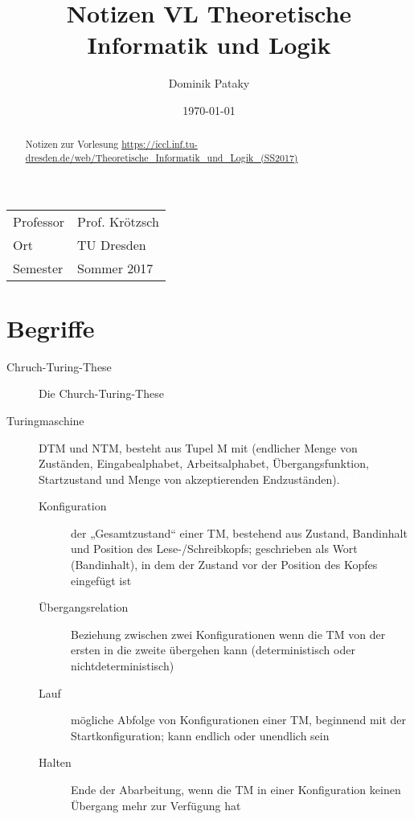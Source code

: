 \documentclass[a4paper,10pt]{article}
\title{Notizen VL Theoretische Informatik und Logik}
\author{Dominik Pataky}
\date{\today}
\newcommand{\vl}[1]{\colorbox{light-gray}{\textcolor{white}{\textbf{VL #1}}}}
\begin{document}
    \pagestyle{fancy}

    \rhead{\slshape\nouppercase{\leftmark}}
    \cfoot{\thepage}

    \maketitle


    \begin{abstract}
        Notizen zur Vorlesung \url{https://iccl.inf.tu-dresden.de/web/Theoretische_Informatik_und_Logik_(SS2017)}
    \end{abstract}


    \tableofcontents

    \vfill
    \begin{tabular}{p{3cm} p{10cm}}
        Professor & Prof. Krötzsch \\
        Ort & TU Dresden \\
        Semester & Sommer 2017 \\
    \end{tabular}


    \newpage
    \section{Begriffe}

    \begin{description}
        \item[Chruch-Turing-These] Die Church-Turing-These
        \item[Turingmaschine] DTM und NTM, besteht aus Tupel M mit (endlicher Menge von Zuständen, Eingabealphabet, Arbeitsalphabet, Übergangsfunktion, Startzustand und Menge von akzeptierenden Endzuständen). \vl{1}
        \begin{description}
            \item[Konfiguration]
                der „Gesamtzustand“ einer TM, bestehend aus Zustand, Bandinhalt und Position des Lese-/Schreibkopfs;
                geschrieben als Wort (Bandinhalt), in dem der Zustand vor der Position des Kopfes eingefügt ist
            \item[Übergangsrelation]
                Beziehung zwischen zwei Konfigurationen wenn die TM von der ersten in die zweite übergehen kann
                (deterministisch oder nichtdeterministisch)
            \item[Lauf]
                mögliche Abfolge von Konfigurationen einer TM, beginnend mit der Startkonfiguration; kann endlich oder unendlich sein
            \item[Halten]
                Ende der Abarbeitung, wenn die TM in einer Konfiguration keinen Übergang mehr zur Verfügung hat
        \end{description}
    \end{description}
\end{document}
